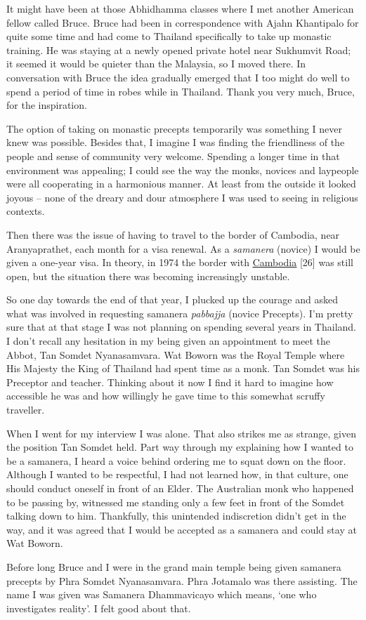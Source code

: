 It might have been at those Abhidhamma classes where I met another
American fellow called Bruce. Bruce had been in correspondence with
Ajahn Khantipalo for quite some time and had come to Thailand
specifically to take up monastic training. He was staying at a newly
opened private hotel near Sukhumvit Road; it seemed it would be quieter
than the Malaysia, so I moved there. In conversation with Bruce the idea
gradually emerged that I too might do well to spend a period of time in
robes while in Thailand. Thank you very much, Bruce, for the
inspiration.

The option of taking on monastic precepts temporarily was something I
never knew was possible. Besides that, I imagine I was finding the
friendliness of the people and sense of community very welcome. Spending
a longer time in that environment was appealing; I could see the way the
monks, novices and laypeople were all cooperating in a harmonious
manner. At least from the outside it looked joyous -- none of the dreary
and dour atmosphere I was used to seeing in religious contexts.

Then there was the issue of having to travel to the border of Cambodia,
near Aranyaprathet, each month for a visa renewal. As a \emph{samanera}
(novice) I would be given a one-year visa. In theory, in 1974 the border
with
\href{https://en.wikipedia.org/wiki/Cambodian_Civil_War}{\underline{Cambodia}}
{[}26{]} was still open, but the situation there was becoming
increasingly unstable.

So one day towards the end of that year, I plucked up the courage and
asked what was involved in requesting samanera \emph{pabbajja} (novice
Precepts). I'm pretty sure that at that stage I was not planning on
spending several years in Thailand. I don't recall any hesitation in my
being given an appointment to meet the Abbot, Tan Somdet Nyanasamvara.
Wat Boworn was the Royal Temple where His Majesty the King of Thailand
had spent time as a monk. Tan Somdet was his Preceptor and teacher.
Thinking about it now I find it hard to imagine how accessible he was
and how willingly he gave time to this somewhat scruffy traveller.

When I went for my interview I was alone. That also strikes me as
strange, given the position Tan Somdet held. Part way through my
explaining how I wanted to be a samanera, I heard a voice behind
ordering me to squat down on the floor. Although I wanted to be
respectful, I had not learned how, in that culture, one should conduct
oneself in front of an Elder. The Australian monk who happened to be
passing by, witnessed me standing only a few feet in front of the Somdet
talking down to him. Thankfully, this unintended indiscretion didn't get
in the way, and it was agreed that I would be accepted as a samanera and
could stay at Wat Boworn.

Before long Bruce and I were in the grand main temple being given
samanera precepts by Phra Somdet Nyanasamvara. Phra Jotamalo was there
assisting. The name I was given was Samanera Dhammavicayo which means,
`one who investigates reality'. I felt good about that.

